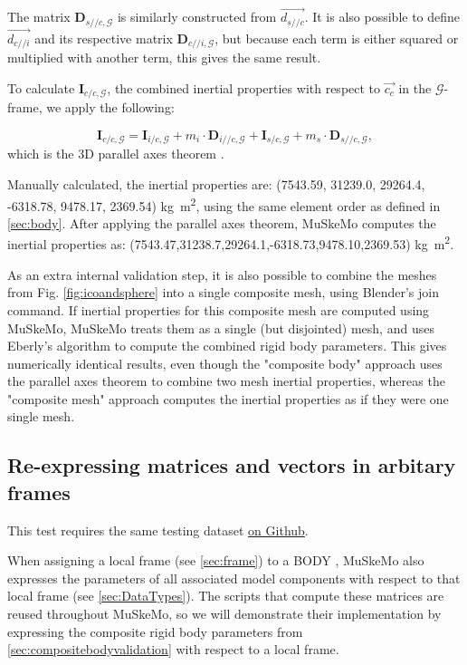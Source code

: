 \documentclass{article}
\begin{document}
The matrix \(\mathbf{D}_{s//c,\mathcal{G}}\) is similarly constructed from \(\vec{{d_{s//c}}}\). It is also possible to define \(\vec{d_{c//i}}\) and its respective matrix \(\mathbf{D}_{c//i,\mathcal{G}}\), but because each term is either squared or multiplied with another term, this gives the same result.

To calculate \(\mathbf{I}_{c/c,{\mathcal{G}}}\), the combined inertial properties with respect to \(\vec{c_c}\) in the \(\mathcal{G}\)-frame, we apply the following:

\begin{equation}
\mathbf{I}_{c/c,{\mathcal{G}}} = \mathbf{I}_{i/c,{\mathcal{G}}} + m_i \cdot \mathbf{D}_{i//c,\mathcal{G}} +  \mathbf{I}_{s/c,{\mathcal{G}}} + m_s \cdot \mathbf{D}_{s//c,\mathcal{G}},
\end{equation}
which is the 3D parallel axes theorem \cite{valleryAdvancedDynamics2019,ruinaMechanicsToolsetStatics2019}.

Manually calculated, the inertial properties are:
(7543.59, 31239.0, 29264.4, -6318.78, 9478.17, 2369.54) \si{kg m^2}, using the same element order as defined in \ref{sec:body}. After applying the parallel axes theorem, MuSkeMo computes the inertial properties as: (7543.47,31238.7,29264.1,-6318.73,9478.10,2369.53) \si{kg m^2}.

As an extra internal validation step, it is also possible to combine the meshes from Fig. \ref{fig:icoandsphere} into a single composite mesh, using Blender's join command. If inertial properties for this composite mesh are computed using MuSkeMo, MuSkeMo treats them as a single (but disjointed) mesh, and uses Eberly's algorithm to compute the combined rigid body parameters. This gives numerically identical results, even though the "composite body" approach uses the parallel axes theorem to combine two mesh inertial properties, whereas the "composite mesh" approach computes the inertial properties as if they were one single mesh.

\subsection{Re-expressing matrices and vectors in arbitary frames}
\label{sec:framevalidation}

This test requires the same testing dataset \href{https://github.com/PashavanBijlert/MuSkeMo/releases/tag/v0.x}{on Github}.


When assigning a local frame (see \ref{sec:frame}) to a BODY , MuSkeMo also expresses the parameters of all associated model components with respect to that local frame (see \ref{sec:DataTypes}). The scripts that compute these matrices are reused throughout MuSkeMo, so we will demonstrate their implementation by expressing the composite rigid body parameters from \ref{sec:compositebodyvalidation} with respect to a local frame.
\end{document}
